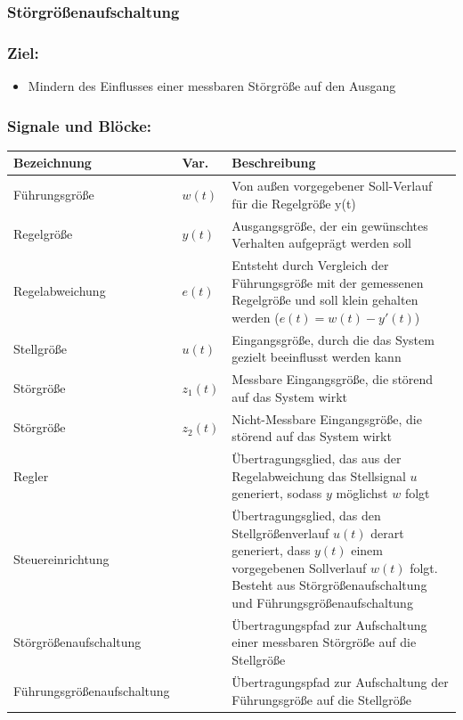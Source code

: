 \documentclass[10pt,a4paper]{article}
\begin{document}

\subsubsection{Störgrößenaufschaltung}
\subsubsection*{Ziel:}
\begin{itemize}
	\item Mindern des Einflusses einer messbaren Störgröße auf den Ausgang
\end{itemize}

\subsubsection*{Signale und Blöcke:}
\begin{tabularx}{\columnwidth}{llX}
	Bezeichnung & Var. & Beschreibung \\
	\hline
	Führungsgröße & $w(t)$ & Von außen vorgegebener Soll-Verlauf für die Regelgröße y(t) \\
	Regelgröße & $y(t)$ & Ausgangsgröße, der ein gewünschtes Verhalten aufgeprägt werden soll \\
	Regelabweichung & $e(t)$ & Entsteht durch Vergleich der Führungsgröße mit der gemessenen Regelgröße und soll klein gehalten werden ($e(t) = w(t) - y'(t)$) \\
	Stellgröße & $u(t)$ & Eingangsgröße, durch die das System gezielt beeinflusst werden kann \\
	Störgröße & $z_1(t)$ & Messbare Eingangsgröße, die störend auf das System wirkt \\
	Störgröße & $z_2(t)$ & Nicht-Messbare Eingangsgröße, die störend auf das System wirkt \\
	Regler && Übertragungsglied, das aus der Regelabweichung das Stellsignal $u$ generiert, sodass $y$ möglichst $w$ folgt \\
	Steuereinrichtung && Übertragungsglied, das den Stellgrößenverlauf $u(t)$ derart generiert, dass $y(t)$ einem vorgegebenen Sollverlauf $w(t)$ folgt. Besteht aus Störgrößenaufschaltung und Führungsgrößenaufschaltung \\
	Störgrößenaufschaltung && Übertragungspfad zur Aufschaltung einer messbaren Störgröße auf die Stellgröße \\
	Führungsgrößenaufschaltung && Übertragungspfad zur Aufschaltung der Führungsgröße auf die Stellgröße
\end{tabularx}
\end{document}
